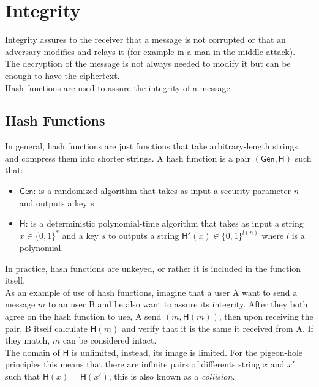 \section{Integrity}
Integrity assures to the receiver that a message is not corrupted or that an adversary modifies and relays it (for example in a man-in-the-middle attack).\\
The decryption of the message is not always needed to modify it but can be enough to have the ciphertext.\\
Hash functions are used to assure the integrity of a message.

\subsection{Hash Functions}
In general, hash functions are just functions that take arbitrary-length strings and compress them into shorter strings.
A hash function is a pair $(\mathsf{Gen}, \mathsf{H})$ such that:
\begin{itemize}
    \item{$\mathsf{Gen}$: is a randomized algorithm that takes as input a security parameter $n$ and outputs a key $s$}
    \item{$\mathsf{H}$: is a deterministic polynomial-time algorithm that takes as input a string $x \in \{0,1\}^*$ and a key $s$ to outputs a string $\mathsf{H}^s(x) \in \{0,1\}^{\mathit{l}(n)}$ where $\mathit{l}$ is a polynomial.}
\end{itemize}
In practice, hash functions are unkeyed, or rather it is included in the function itself.\\
As an example of use of hash functions, imagine that a user A want to send a message $m$ to an user B and he also want to assure its integrity. After they both agree on the hash function to use, A send $(m, \mathsf{H}(m))$, then upon receiving the pair, B itself calculate $\mathsf{H}(m)$ and verify that it is the same it received from A. If they match, $m$ can be considered intact.\\
The domain of $\mathsf{H}$ is unlimited, instead, its image is limited. For the pigeon-hole principles this means that there are infinite pairs of differents string $x$ and $x'$ such that $\mathsf{H}(x) = \mathsf{H}(x')$, this is also known as a \emph{collision}.

